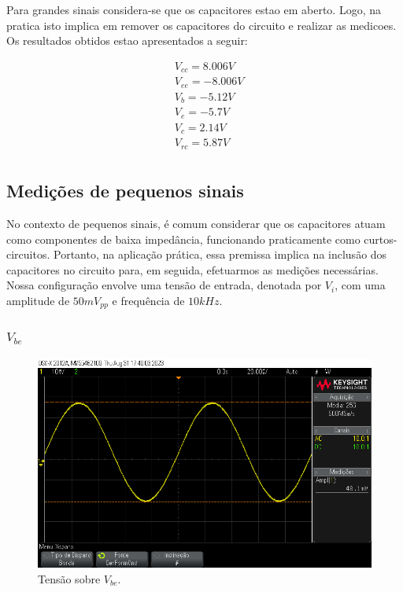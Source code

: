 Para grandes sinais considera-se que os capacitores estao em aberto. Logo, na pratica isto implica em remover os capacitores do circuito e realizar as medicoes. Os resultados obtidos estao apresentados a seguir:

\begin{equation}
    \begin{aligned}
         & V_{cc} = 8.006  V \\
         & V_{ee} = -8.006 V \\
         & V_b = - 5.12 V    \\
         & V_e = -5.7 V      \\
         & V_c = 2.14 V      \\
         & V_{rc} = 5.87 V   \\
    \end{aligned}
\end{equation}

\subsection{Medições de pequenos sinais}

No contexto de pequenos sinais, é comum considerar que os capacitores atuam como componentes de baixa impedância, funcionando praticamente como curtos-circuitos. Portanto, na aplicação prática, essa premissa implica na inclusão dos capacitores no circuito para, em seguida, efetuarmos as medições necessárias. Nossa configuração envolve uma tensão de entrada, denotada por $V_i$, com uma amplitude de $50 mV_{pp}$ e frequência de $10 kHz$.

\subsubsection{$V_{be}$}

\begin{figure}[H]
    \centering
    \includegraphics[width=0.5\columnwidth]{images/v_be.png}
    \caption{Tensão sobre $V_{be}$.}
\end{figure}

